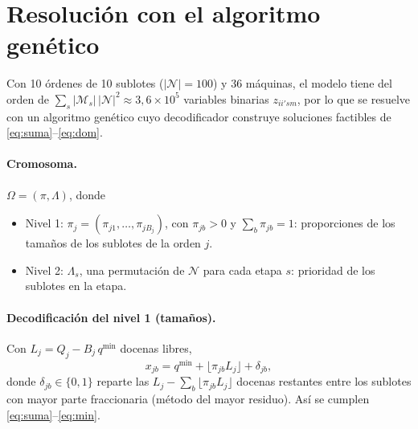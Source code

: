 \documentclass[11pt,a4paper]{article}
\newcommand{\N}{\mathcal{N}}
\newcommand{\M}{\mathcal{M}}
\begin{document}
\section{Resolución con el algoritmo genético}

Con 10 órdenes de 10 sublotes ($|\N| = 100$) y 36 máquinas, el modelo tiene del
orden de $\sum_s |\M_s|\,|\N|^2 \approx 3{,}6\times 10^5$ variables binarias
$z_{ii'sm}$, por lo que se resuelve con un algoritmo genético cuyo
decodificador construye soluciones factibles de
\eqref{eq:suma}--\eqref{eq:dom}.

\paragraph{Cromosoma.} $\Omega = (\pi, \Lambda)$, donde
\begin{itemize}
  \item Nivel 1: $\pi_j = (\pi_{j1},\dots,\pi_{jB_j})$, con $\pi_{jb} > 0$ y
        $\sum_b \pi_{jb} = 1$: proporciones de los tamaños de los sublotes de la orden $j$.
  \item Nivel 2: $\Lambda_s$, una permutación de $\N$ para cada etapa $s$:
        prioridad de los sublotes en la etapa.
\end{itemize}

\paragraph{Decodificación del nivel 1 (tamaños).}
Con $L_j = Q_j - B_j\, q^{\min}$ docenas libres,
\[
  x_{jb} = q^{\min} + \lfloor \pi_{jb} L_j \rfloor + \delta_{jb},
\]
donde $\delta_{jb}\in\{0,1\}$ reparte las
$L_j - \sum_b \lfloor \pi_{jb} L_j \rfloor$ docenas restantes entre los sublotes con
mayor parte fraccionaria (método del mayor residuo). Así se cumplen
\eqref{eq:suma}--\eqref{eq:min}.
\end{document}

